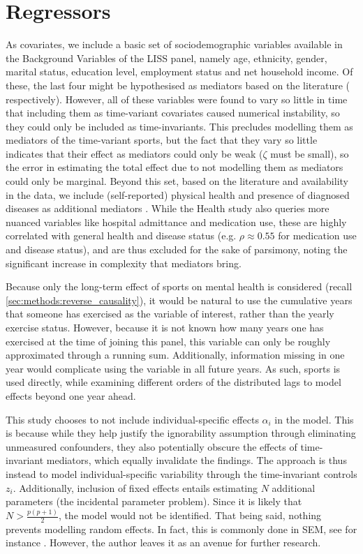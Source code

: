 \section{Regressors}
\label{sec:modelling:regressors}
As covariates, we include a basic set of sociodemographic variables available in the Background Variables of the LISS panel,
namely age, ethnicity, gender, marital status, education level, employment status and net household income.
Of these, the last four might be hypothesised as mediators based on the literature
( respectively).
However, all of these variables were found to vary so little in time that including them as time-variant covariates caused
numerical instability, so they could only be included as time-invariants. This precludes modelling them as mediators
of the time-variant sports,
but the fact that they vary so little indicates that their effect as mediators could only be weak ($\zeta$ must be small),
so the error in estimating the total effect due to not modelling them as mediators could only be marginal.
Beyond this set, based on the literature and availability in the data, we include (self-reported) physical health
and presence of diagnosed diseases as additional mediators \cite{westcott2012resistance}.
While the Health study also queries more nuanced variables like hospital admittance and medication use, these are
highly correlated with general health and disease status (e.g. $\rho \approx 0.55$ for medication use and disease status),
and are thus excluded for the sake of parsimony, noting the significant increase in complexity that mediators bring.

Because only the long-term effect of sports on mental health is considered (recall \cref{sec:methods:reverse_causality}),
it would be natural to use the cumulative years that someone has exercised as the variable of interest, rather than the
yearly exercise status. However, because it is not known how many years one has exercised at the time of joining this panel,
this variable can only be roughly approximated through a running sum. Additionally, information missing in one year would
complicate using the variable in all future years.
As such, sports is used directly, while examining different orders of the distributed lags to model effects beyond
one year ahead.

This study chooses to not include individual-specific effects $\alpha_i$ in the model. This is because while they help justify
the ignorability assumption through eliminating unmeasured confounders, they also potentially obscure the effects of time-invariant mediators,
which equally invalidate the findings. The approach is thus instead to model individual-specific variability through the
time-invariant controls $z_i$. Additionally, inclusion of fixed effects entails estimating $N$ additional parameters
(the incidental parameter problem). Since it is likely that $N > \frac{p(p + 1)}{2}$, the model would not be identified.
That being said, nothing prevents modelling random effects. In fact, this is commonly done in
SEM, see for instance . However, the author leaves it as an avenue for further research.

